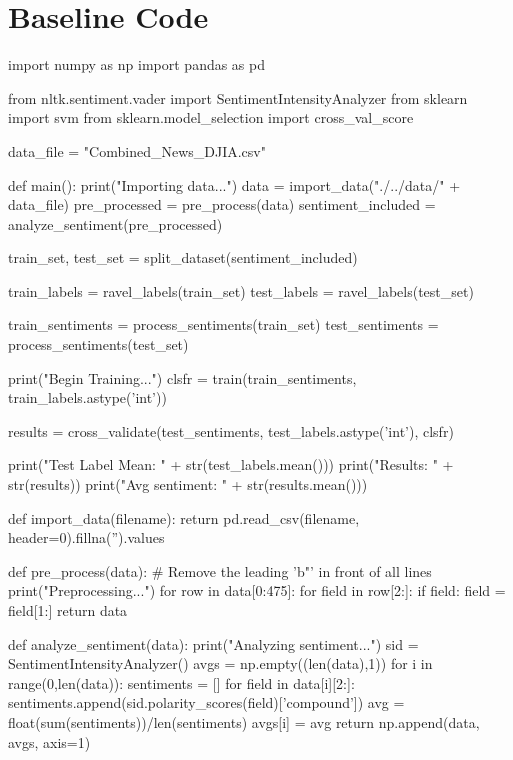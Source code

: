 \documentclass{article} %
\begin{document}


\section{Baseline Code}

\begin{python}
import numpy as np
import pandas as pd

from nltk.sentiment.vader import SentimentIntensityAnalyzer
from sklearn import svm
from sklearn.model_selection import cross_val_score

data_file = "Combined_News_DJIA.csv"

def main():
  print("Importing data...")
  data = import_data("./../data/" + data_file)
  pre_processed = pre_process(data)
  sentiment_included = analyze_sentiment(pre_processed)

  train_set, test_set = split_dataset(sentiment_included)

  train_labels = ravel_labels(train_set)
  test_labels = ravel_labels(test_set)

  train_sentiments = process_sentiments(train_set)
  test_sentiments = process_sentiments(test_set)

  print("Begin Training...")
  clsfr = train(train_sentiments, train_labels.astype('int'))

  results = cross_validate(test_sentiments, test_labels.astype('int'), clsfr)

  print("Test Label Mean: " + str(test_labels.mean()))
  print("Results: " + str(results))
  print("Avg sentiment: " + str(results.mean()))

def import_data(filename):
  return pd.read_csv(filename, header=0).fillna('').values

def pre_process(data):
  # Remove the leading 'b"' in front of all lines
  print("Preprocessing...")
  for row in data[0:475]:
    for field in row[2:]:
      if field:
        field = field[1:]
  return data

def analyze_sentiment(data):
  print("Analyzing sentiment...")
  sid = SentimentIntensityAnalyzer()
  avgs = np.empty((len(data),1))
  for i in range(0,len(data)):
    sentiments = []
    for field in data[i][2:]:
      sentiments.append(sid.polarity_scores(field)['compound'])
    avg = float(sum(sentiments))/len(sentiments)
    avgs[i] = avg
  return np.append(data, avgs, axis=1)


\end{python}
\end{document}
